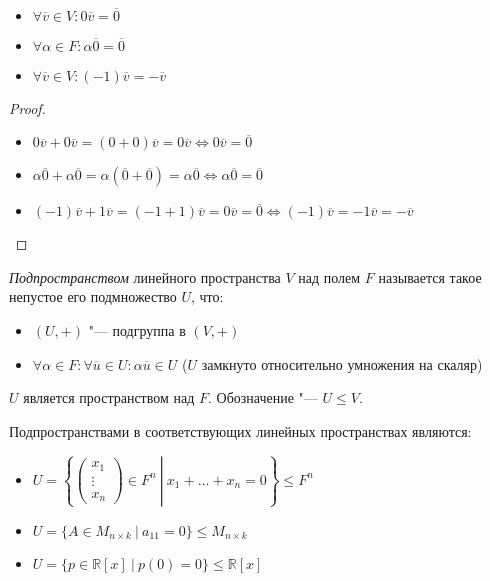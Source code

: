 \begin{proposition}~
	\begin{itemize}
		\item $\forall \overline{v} \in V: 0\overline{v} = \overline{0}$
		\item $\forall \alpha \in F: \alpha\overline{0} = \overline{0}$
		\item $\forall \overline{v} \in V: (-1)\overline{v} = -\overline{v}$
	\end{itemize}
\end{proposition}

\begin{proof}~
	\begin{itemize}
		\item $0\overline{v} + 0\overline{v} = (0 + 0)\overline{v} = 0\overline{v} \Leftrightarrow 0\overline{v} = \overline{0}$
		\item $\alpha\overline{0} + \alpha\overline{0} = \alpha(\overline{0} + \overline{0}) = \alpha\overline{0} \Leftrightarrow \alpha\overline{0} = \overline{0}$
		\item $(-1)\overline{v} + 1\overline{v} = (-1 + 1)\overline{v} = 0\overline{v} = \overline{0} \Leftrightarrow (-1)\overline{v} = -1\overline{v} = -\overline{v}$
	\end{itemize}
\end{proof}

\begin{definition}
	\textit{Подпространством} линейного пространства $V$ над полем $F$ называется такое непустое его подмножество $U$, что:
	\begin{itemize}
		\item $(U, +)$ "--- подгруппа в $(V, +)$
		\item $\forall \alpha \in F: \forall \overline{u} \in U: \alpha\overline{u} \in U$ ($U$ замкнуто относительно умножения на скаляр)
	\end{itemize}
	
	$U$ является пространством над $F$. Обозначение "--- $U \le V$.
\end{definition}

\begin{example}
	Подпространствами в соответствующих линейных пространствах являются:
	\begin{itemize}
		\item $U = \left\{\left.\begin{pmatrix}x_1\\\vdots\\x_n\end{pmatrix} \in F^n~\right|~x_1+\dots+x_n = 0\right\} \le F^n$
		\item $U = \{A \in M_{n \times k}~|~a_{11} = 0\} \le M_{n \times k}$
		\item $U = \{p \in \mathbb{R}[x]~|~p(0) = 0\} \le \mathbb{R}[x]$
	\end{itemize}
\end{example}

